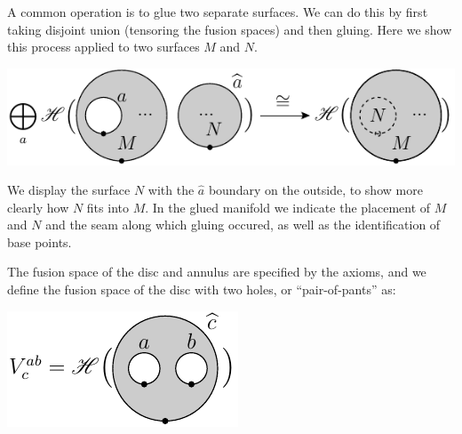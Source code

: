 \documentclass[aps, prl, letterpaper, twocolumn, superscriptaddress, notitlepage, 10pt]{revtex4-1}
\begin{document}
A common operation is to glue two separate surfaces.
We can do this by first taking disjoint union (tensoring
the fusion spaces)
and then gluing.
Here we show this process applied to two surfaces $M$ and $N$. 
\begin{center}
\includegraphics[]{pic-glue.pdf}
\end{center}
We display the surface $N$ with the $\widehat{a}$
boundary on the outside, 
to show more clearly how $N$ fits into $M$.
In the glued manifold we
indicate the placement of $M$ and $N$ and the seam
along which gluing occured,
as well as the identification of base points.


The fusion space of the disc and annulus are
specified by the axioms, and we define the fusion
space of the disc with two holes, or ``pair-of-pants''
as:
\begin{center}
\includegraphics[]{pic-pop.pdf}
\end{center}
\end{document}

